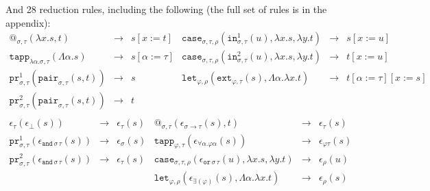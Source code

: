 \documentclass[a4paper,UKenglish,cleveref,autoref,numberwithinsect]{lipics-v2019}
\theoremstyle{definition}
\newcommand{\arrtype}{\rightarrow}
\newcommand{\quant}[2]{\forall #1.#2}
\newcommand{\abs}[2]{\lambda #1.#2}
\newcommand{\tabs}[2]{\Lambda #1.#2}
\newcommand{\red}{\longrightarrow}
\newcommand{\proj}{\mathtt{pr}}
\begin{document}
And 28 reduction rules, including the following (the full set of rules is in the appendix):
\[
\begin{array}{rclrcl}
@_{\sigma,\tau}(\abs{x}{s},t) & \red & s[x:=t] &
\mathtt{case}_{\sigma,\tau,\rho}(\mathtt{in}^1_{\sigma,\tau}(u),
  \abs{x}{s},\abs{y}{t}) & \red & s[x:=u] \\

\mathtt{tapp}_{\abs{\alpha}{\sigma},\tau}(\tabs{\alpha}{s}) & \red &
  s[\alpha:=\tau] &
\mathtt{case}_{\sigma,\tau,\rho}(\mathtt{in}^2_{\sigma,\tau}(u),
  \abs{x}{s},\abs{y}{t}) & \red & t[x:=u] \\

\proj^1_{\sigma,\tau}(\mathtt{pair}_{\sigma,\tau}(s,t)) & \red & s &
\mathtt{let}_{\varphi,\rho}(\mathtt{ext}_{\varphi,\tau}(s),\tabs{\alpha}{\abs{x}{t}}) & \red & t[\alpha:=\tau][x:=s] \\

\proj^2_{\sigma,\tau}(\mathtt{pair}_{\sigma,\tau}(s,t)) & \red & t \\
\end{array}
\]
\[
\begin{array}{rclrcl}
\epsilon_\tau(\epsilon_\bot(s)) & \red & \epsilon_\tau(s) &
@_{\sigma,\tau}(\epsilon_{\sigma \arrtype \tau}(s),t) & \red &
  \epsilon_\tau(s) \\

\proj^1_{\sigma,\tau}(\epsilon_{\mathtt{and}\,\sigma\,\tau}(s)) & \red &
  \epsilon_\sigma(s) &
\mathtt{tapp}_{\varphi,\tau}(
  \epsilon_{\quant{\alpha}{\varphi\alpha}}(s)) & \red &
  \epsilon_{\varphi\tau}(s) \\

\proj^2_{\sigma,\tau}(\epsilon_{\mathtt{and}\,\sigma\,\tau}(s)) & \red &
  \epsilon_\tau(s) &
\mathtt{case}_{\sigma,\tau,\rho}(\epsilon_{\mathtt{or}\,\sigma\,\tau}(
  u),\abs{x}{s},\abs{y}{t}) & \red & \epsilon_\rho(u) \\

& & & 
\mathtt{let}_{\varphi,\rho}(\epsilon_{\exists(\varphi)}(s),\tabs{\alpha}{\abs{x}{t}}) & \red &
  \epsilon_\rho(s) \\
\end{array}
\]
\end{document}
